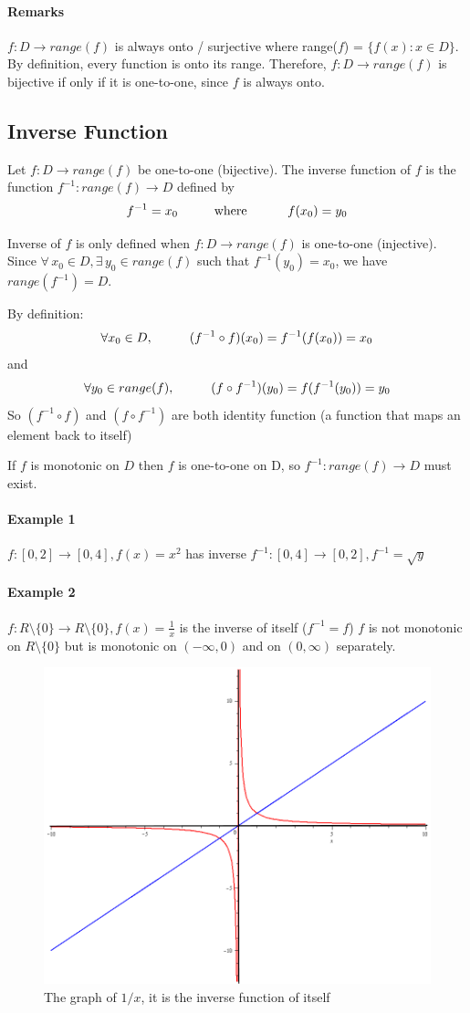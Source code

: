 \documentclass[12pt]{article}
\newcommand\tab[1][1cm]{\hspace*{#1}}
\begin{document}
\paragraph{Remarks}
$f : D \to range(f)$ is always onto / surjective where range($f$) = $\{f(x) : x \in D \}$. By definition, every function
is onto its range. Therefore, $f : D \to range(f)$ is bijective if only if it is one-to-one, since $f$ is always onto.

\subsection{Inverse Function}
Let $f : D \to range(f)$ be one-to-one (bijective). The inverse function of $f$ is the function $f^{-1} : range(f) \to D$ defined by 
\[
    f^{ - 1} = x_0 \textrm{\tab where \tab} f(x_0) = y_0
\] 

Inverse of $f$ is only defined when $f : D \to range(f)$ is one-to-one (injective). Since $\forall \, x_0 \in D, \exists \, y_0 \in range(f)$ such that $f^{-1}(y_0) = x_0$,
we have $range(f^{-1}) = D$.

By definition:
\[
    \forall x_0 \in D, \textrm{\tab} (f^{-1} \circ f)(x_0) = f^{-1}(f(x_0)) = x_0
\]
and
\[
    \forall y_0 \in range(f), \textrm{\tab} (f \circ f^{-1})(y_0) = f(f^{-1}(y_0)) = y_0
\]
So $(f^{-1} \circ f)$ and $(f \circ f^{-1})$ are both identity function (a function that maps an element back to itself)

If $f$ is monotonic on $D$ then $f$ is one-to-one on D, so $f^{-1} : range(f) \to D$ must exist.
\paragraph{Example 1} $f : [0, 2] \to [0, 4], f(x) = x^2$ has inverse $f^{-1} : [0,4] \to [0,2], f^{-1} = \sqrt{y}$
\paragraph{Example 2} $f : R \setminus \{0\} \to R \setminus \{0\}, f(x) = \frac{1}{x}$ is the inverse of itself ($f^{-1} = f$) 
$f$ is not monotonic on $R \setminus \{0\}$ but is monotonic on $(-\infty, 0)$ and on $(0, \infty)$ separately.
\begin{figure}[H]
    \centering
    \includegraphics[width = 0.4\linewidth]{Images/graph of 1perx.png}
    \caption{The graph of $1/x$, it is the inverse function of itself}
\end{figure}
\end{document}
